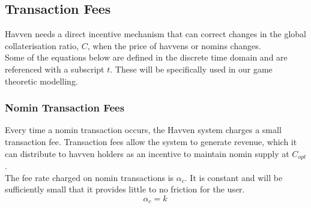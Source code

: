 

\newpage
\subsection{Transaction Fees} Havven needs a direct incentive mechanism that can correct changes in the global collaterisation ratio, $C$, when the price of havvens or nomins changes. \\

\noindent Some of the equations below are defined in the discrete time domain and are referenced with a subscript $t$. These will be specifically used in our game theoretic modelling.

\subsubsection{Nomin Transaction Fees} Every time a nomin transaction occurs, the Havven system charges a small transaction fee. Transaction fees allow the system to generate revenue, which it can distribute to havven holders as an incentive to maintain nomin supply at $C_{opt}$. \\

\noindent The fee rate charged on nomin transactions is $\alpha_c$. It is constant and will be sufficiently small that it provides little to no friction for the user.\\

\begin{equation}
\alpha_c = k \ \label{eq:5}
\end{equation}

\begin{center}
\end{center}


